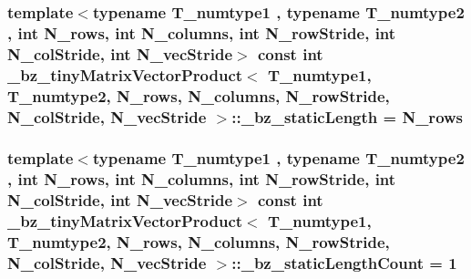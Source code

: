 \subsubsection[{\+\_\+bz\+\_\+static\+Length}]{\setlength{\rightskip}{0pt plus 5cm}template$<$typename T\+\_\+numtype1 , typename T\+\_\+numtype2 , int N\+\_\+rows, int N\+\_\+columns, int N\+\_\+row\+Stride, int N\+\_\+col\+Stride, int N\+\_\+vec\+Stride$>$ const int {\bf \+\_\+bz\+\_\+tiny\+Matrix\+Vector\+Product}$<$ T\+\_\+numtype1, T\+\_\+numtype2, N\+\_\+rows, N\+\_\+columns, N\+\_\+row\+Stride, N\+\_\+col\+Stride, N\+\_\+vec\+Stride $>$\+::\+\_\+bz\+\_\+static\+Length = N\+\_\+rows\hspace{0.3cm}{\ttfamily [static]}}\label{class__bz__tinyMatrixVectorProduct_a9b189cec2a5d1f923f73480e6100edff}
\hypertarget{class__bz__tinyMatrixVectorProduct_a15cc23ca89326eb0df99a66afdb37532}{}
\subsubsection[{\+\_\+bz\+\_\+static\+Length\+Count}]{\setlength{\rightskip}{0pt plus 5cm}template$<$typename T\+\_\+numtype1 , typename T\+\_\+numtype2 , int N\+\_\+rows, int N\+\_\+columns, int N\+\_\+row\+Stride, int N\+\_\+col\+Stride, int N\+\_\+vec\+Stride$>$ const int {\bf \+\_\+bz\+\_\+tiny\+Matrix\+Vector\+Product}$<$ T\+\_\+numtype1, T\+\_\+numtype2, N\+\_\+rows, N\+\_\+columns, N\+\_\+row\+Stride, N\+\_\+col\+Stride, N\+\_\+vec\+Stride $>$\+::\+\_\+bz\+\_\+static\+Length\+Count = 1\hspace{0.3cm}{\ttfamily [static]}}\label{class__bz__tinyMatrixVectorProduct_a15cc23ca89326eb0df99a66afdb37532}
\hypertarget{class__bz__tinyMatrixVectorProduct_a0da5a156f008517b588fc17334754eef}{}
